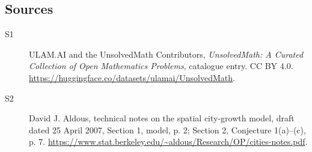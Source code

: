\documentclass[11pt]{article}
\begin{document}
\subsection{Sources}
\begin{description}
\item[\hypertarget{source:statement:1}{S1}] ULAM.AI and the UnsolvedMath Contributors, \emph{UnsolvedMath: A Curated Collection of Open Mathematics Problems}, catalogue entry. CC BY 4.0. \url{https://huggingface.co/datasets/ulamai/UnsolvedMath}.
\item[\hypertarget{source:statement:2}{S2}] David J. Aldous, technical notes on the spatial city-growth model, draft dated 25 April 2007, Section 1, model, p. 2; Section 2, Conjecture 1(a)--(c), p. 7. \url{https://www.stat.berkeley.edu/~aldous/Research/OP/cities-notes.pdf}.
\end{description}
\label{end:statement}
\end{document}

